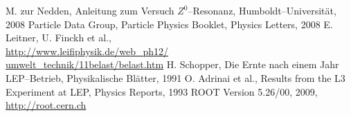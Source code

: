\renewcommand{\refname}{Literatur und Programme}
\begin{thebibliography}{xxxxxx}
M. zur Nedden, Anleitung zum Versuch $Z^0$–Resonanz, Humboldt–Universität, 2008
Particle Data Group, Particle Physics Booklet, Physics Letters, 2008
E. Leitner, U. Finckh et al.,\\
\href{http://www.leifiphysik.de/web_ph12/umwelt_technik/11belast/belast.htm}{http://www.leifiphysik.de/web\_ph12/\\umwelt\_technik/11belast/belast.htm}
H. Schopper, Die Ernte nach einem Jahr LEP–Betrieb, Physikalische Blätter, 1991
O. Adrinai et al., Results from the L3 Experiment at LEP,  Physics Reports, 1993
ROOT Version 5.26/00, 2009, \href{http://root.cern.ch}{http://root.cern.ch}
\end{thebibliography}